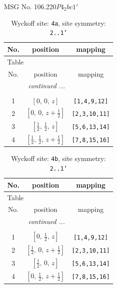 \documentclass[fleqn,8pt]{jsarticle}
\begin{document}
\setcounter{MaxMatrixCols}{32}

\renewcommand{\tablename}{Table~}
\renewcommand{\figurename}{Figure~}
\begin{center}
\LARGE
MSG No. 106.220\quad$P4_{2}bc1'$
\end{center}
\renewcommand{\arraystretch}{1.2}
\begin{longtable}{ccc}
\caption{Wyckoff site: {\tt 4a}, site symmetry: {\tt 2..1'}}
 \\
 \hline \hline
No. & position & mapping \\ \hline \endfirsthead

\multicolumn{2}{l}{\tablename\ \thetable{}} \\
 \hline \hline
No. & position & mapping \\ \hline \endhead

 \hline \hline
\multicolumn{2}{r}{\footnotesize\it continued ...} \\ \endfoot

 \hline \hline
\multicolumn{2}{r}{} \\ \endlastfoot

1 & $\left[ 0,\, 0,\, z \right]$ & {\tt [1,4,9,12]} \\ \hline
2 & $\left[ 0,\, 0,\, z + \frac{1}{2} \right]$ & {\tt [2,3,10,11]} \\ \hline
3 & $\left[ \frac{1}{2},\, \frac{1}{2},\, z \right]$ & {\tt [5,6,13,14]} \\ \hline
4 & $\left[ \frac{1}{2},\, \frac{1}{2},\, z + \frac{1}{2} \right]$ & {\tt [7,8,15,16]} \\
\end{longtable}
\renewcommand{\arraystretch}{1.2}
\begin{longtable}{ccc}
\caption{Wyckoff site: {\tt 4b}, site symmetry: {\tt 2..1'}}
 \\
 \hline \hline
No. & position & mapping \\ \hline \endfirsthead

\multicolumn{2}{l}{\tablename\ \thetable{}} \\
 \hline \hline
No. & position & mapping \\ \hline \endhead

 \hline \hline
\multicolumn{2}{r}{\footnotesize\it continued ...} \\ \endfoot

 \hline \hline
\multicolumn{2}{r}{} \\ \endlastfoot

1 & $\left[ 0,\, \frac{1}{2},\, z \right]$ & {\tt [1,4,9,12]} \\ \hline
2 & $\left[ \frac{1}{2},\, 0,\, z + \frac{1}{2} \right]$ & {\tt [2,3,10,11]} \\ \hline
3 & $\left[ \frac{1}{2},\, 0,\, z \right]$ & {\tt [5,6,13,14]} \\ \hline
4 & $\left[ 0,\, \frac{1}{2},\, z + \frac{1}{2} \right]$ & {\tt [7,8,15,16]} \\
\end{longtable}
\end{document}
